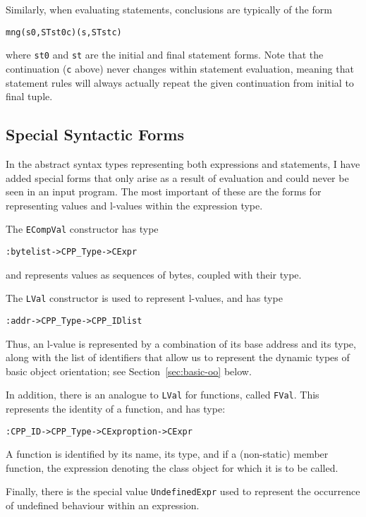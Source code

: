 \documentclass[11pt]{article}
\begin{document}
Similarly, when evaluating statements, conclusions are typically of
the form 
\begin{alltt}
   mng (s0, ST st0 c) (s, ST st c)
\end{alltt}
where \texttt{st0} and \texttt{st} are the initial and final statement
forms.  Note that the continuation (\texttt{c} above) never changes
within statement evaluation, meaning that statement rules will always
actually repeat the given continuation from initial to final tuple.

\subsection{Special Syntactic Forms}
\label{sec:spec-synt-forms}

In the abstract syntax types representing both expressions and
statements, I have added special forms that only arise as a result of
evaluation and could never be seen in an input program.  The most
important of these are the forms for representing values and l-values
within the expression type.  

The \texttt{ECompVal} constructor has type 
\begin{alltt}
   : byte list -> CPP_Type -> CExpr
\end{alltt}
and represents values as sequences of bytes, coupled with their type. 

The \texttt{LVal} constructor is used to represent l-values, and has
type 
\begin{alltt}
   : addr -> CPP_Type -> CPP_ID list
\end{alltt}
Thus, an l-value is represented by a combination of its base address
and its type, along with the list of identifiers that allow us to
represent the dynamic types of basic object orientation; see
Section~\ref{sec:basic-oo} below.

In addition, there is an analogue to \texttt{LVal} for functions,
called \texttt{FVal}.  This represents the identity of a function, and
has type: 
\begin{alltt}
   : CPP_ID -> CPP_Type -> CExpr option -> CExpr
\end{alltt}
A function is identified by its name, its type, and if a (non-static)
member function, the expression denoting the class object for which it
is to be called.

Finally, there is the special value \texttt{UndefinedExpr} used to
represent the occurrence of undefined behaviour within an expression.
\end{document}

